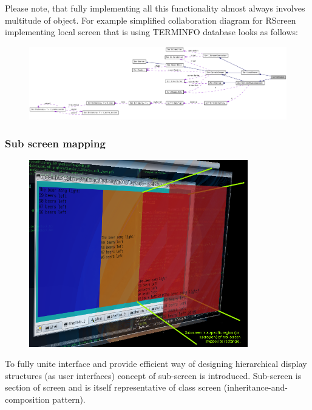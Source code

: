   Please note, that fully implementing all this functionality almost
  always involves multitude of object. For example simplified
  collaboration diagram for RScreen implementing local screen that is
  using TERMINFO database looks as follows:

  \begin{figure}[H]
  \begin{center}
  \leavevmode\includegraphics[width=580pt,angle=270,trim=560pt 0 0 0,clip=true]{graphics/classScr_1_1RScreen__coll__graph}
  \end{center}
  \end{figure}

\subsubsection{Sub screen mapping}
  \begin{figure}[H]
  \begin{center}
  \leavevmode\includegraphics[width=270pt]{graphics/SubscreenMapping}
  \end{center}
  \end{figure}
  To fully unite interface and provide efficient way  of designing
  hierarchical display  structures (as user interfaces) concept of
  sub-screen is introduced. Sub-screen is section of screen and is
  itself representative of class screen (inheritance-and-composition
  pattern). 

